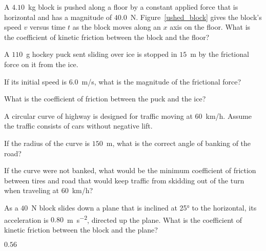 \begin{problem}\label{prb:ushed_block}
	A $4.10$~kg block is pushed along a floor by a constant applied force that is horizontal and has a magnitude of $40.0$~N. Figure~\ref{ushed_block} gives the block’s speed $v$ versus time $t$ as the block moves along an $x$ axis on the floor. What is the coefficient of kinetic friction between the block and the floor?
\end{problem}


\begin{problem}
	A $110$~g hockey puck sent sliding over ice is stopped in $15$~m by the frictional force on it from the ice.
	\begin{enumerate*}[label=(\alph*)]
		\item If its initial speed is $6.0$~m/s, what is the magnitude of the frictional force?
		\item What is the coefficient of friction between the puck and the ice?
	\end{enumerate*}
\end{problem}


\begin{problem}
	A circular curve of highway is designed for traffic moving at $60$~km/h. Assume the traffic consists of cars without negative lift. 
	\begin{enumerate*}[label=(\alph*)]
		\item If the radius of the curve is $150$~m, what is the correct angle of banking of the road?
		\item If the curve were not banked, what would be the minimum coefficient of friction between tires and road that would keep traffic from skidding out of the turn when traveling at $60$~km/h? 
	\end{enumerate*}
\end{problem}


\begin{problem}
	As a $40$~N block slides down a plane that is inclined at \ang{25} to the horizontal, its acceleration is $0.80$~\si{\meter\per\square\second}, directed up the plane. What is the coefficient of kinetic friction between the block and the plane?
	\begin{solution}
		$0.56$
	\end{solution}
\end{problem}


